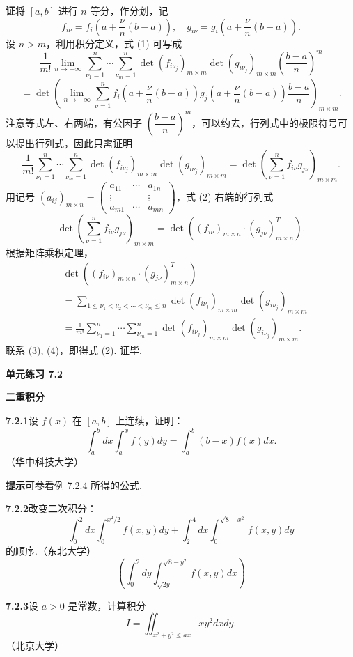 \documentclass[UTF8, 12pt, fontset=fandol, oneside]{ctexart}
\begin{document}
\noindent\textbf{证}\quad 将 $[a,b]$ 进行 $n$ 等分，作分划，记
\[
f_{i\nu}=f_i\left(a+\frac\nu n(b-a)\right),\quad
g_{i\nu}=g_i\left(a+\frac\nu n(b-a)\right).
\]
设 $n>m$，利用积分定义，式 (1) 可写成
\[
\frac1{m!}\lim_{n\to+\infty}
\sum_{\nu_1=1}^n\cdots\sum_{\nu_m=1}^n
\det(f_{i\nu_j})_{m\times m}\det(g_{i\nu_j})_{m\times m}
\left(\frac{b-a}{n}\right)^m
\]
\[
=\det\left(
\lim_{n\to+\infty}\sum_{\nu=1}^n
f_i\left(a+\frac\nu n(b-a)\right)
g_j\left(a+\frac\nu n(b-a)\right)\frac{b-a}{n}
\right)_{m\times m}.
\]
注意等式左、右两端，有公因子 $\left(\dfrac{b-a}{n}\right)^m$，可以约去，行列式中的极限符号可以提出行列式，因此只需证明
\[
\frac1{m!}\sum_{\nu_1=1}^n\cdots\sum_{\nu_m=1}^n
\det(f_{i\nu_j})_{m\times m}\det(g_{i\nu_j})_{m\times m}
=\det\left(\sum_{\nu=1}^n f_{i\nu}g_{j\nu}\right)_{m\times m}. \tag{2}
\]
用记号 $(a_{ij})_{m\times n}=\begin{pmatrix}
a_{11}&\cdots&a_{1n}\\
\vdots&&\vdots\\
a_{m1}&\cdots&a_{mn}
\end{pmatrix}$，式 (2) 右端的行列式
\[
\det\left(\sum_{\nu=1}^n f_{i\nu}g_{j\nu}\right)_{m\times m}
=\det\left((f_{i\nu})_{m\times n}\cdot(g_{j\nu})_{m\times n}^{T}\right). \tag{3}
\]
根据矩阵乘积定理，
\[
\begin{aligned}
&\det\left((f_{i\nu})_{m\times n}\cdot(g_{j\nu})_{m\times n}^{T}\right)\\
&=\sum_{1\le\nu_1<\nu_2<\cdots<\nu_m\le n}
\det(f_{i\nu_j})_{m\times m}\det(g_{i\nu_j})_{m\times m}\\
&=\frac1{m!}\sum_{\nu_1=1}^n\cdots\sum_{\nu_m=1}^n
\det(f_{i\nu_j})_{m\times m}\det(g_{i\nu_j})_{m\times m}.
\end{aligned} \tag{4}
\]
联系 (3), (4)，即得式 (2). 证毕.

\noindent\textbf{单元练习 7.2}

\noindent\textbf{二重积分}

\noindent\textbf{7.2.1}\quad 设 $f(x)$ 在 $[a,b]$ 上连续，证明：
\[
\int_a^bdx\int_a^x f(y)dy=\int_a^b(b-x)f(x)dx.
\]
（华中科技大学）

\noindent\textbf{提示}\quad 可参看例 7.2.4 所得的公式.

\noindent\textbf{7.2.2}\quad 改变二次积分：
\[
\int_0^2dx\int_0^{x^2/2}f(x,y)dy+
\int_2^4dx\int_0^{\sqrt{8-x^2}}f(x,y)dy
\]
的顺序.（东北大学）
\[
\left(\int_0^2dy\int_{\sqrt{2y}}^{\sqrt{8-y^2}}f(x,y)dx\right)
\]

\noindent\textbf{7.2.3}\quad 设 $a>0$ 是常数，计算积分
\[
I=\iint_{x^2+y^2\le ax}xy^2dxdy.
\]
（北京大学）
\end{document}
